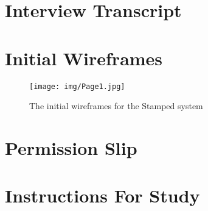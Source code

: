 \documentclass[11pt,openright,a4paper]{report}
\begin{document}
\chapter{Interview Transcript}

\chapter{Initial Wireframes}
\begin{figure}[H]
 \centering
  \texttt{[image: img/Page1.jpg]}
     \caption{The initial wireframes for the Stamped system}
\end{figure}
\chapter{Permission Slip}

\chapter{Instructions For Study}

\end{document}
